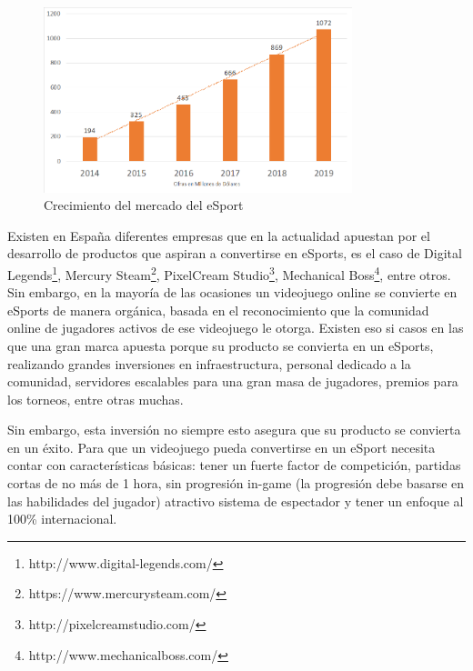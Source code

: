 \begin{figure}[h]
    \centering
    \includegraphics[width=0.8\textwidth]{images/estadodelarte/mercado/crecimiento-esport}
    \caption{Crecimiento del mercado del eSport}
\end{figure}

Existen en España diferentes empresas que en la actualidad apuestan por el desarrollo de productos que aspiran a convertirse en eSports, es el caso de Digital Legends\footnote{http://www.digital-legends.com/}, Mercury Steam\footnote{https://www.mercurysteam.com/}, PixelCream Studio\footnote{http://pixelcreamstudio.com/}, Mechanical Boss\footnote{http://www.mechanicalboss.com/}, entre otros. Sin embargo, en la mayoría de las ocasiones un videojuego online se convierte en eSports de manera orgánica, basada en el reconocimiento que la comunidad online de jugadores activos de ese videojuego le otorga. Existen eso si casos en las que una gran marca apuesta porque su producto se convierta en un eSports, realizando grandes inversiones en infraestructura, personal dedicado a la comunidad, servidores escalables para una gran masa de jugadores, premios para los torneos, entre otras muchas. 

Sin embargo, esta inversión no siempre esto asegura que su producto se convierta en un éxito. Para que un videojuego pueda convertirse en un eSport necesita contar con características básicas: tener un fuerte factor de competición, partidas cortas de no más de 1 hora, sin progresión in-game (la progresión debe basarse en las habilidades del jugador) atractivo sistema de espectador y tener un enfoque al 100\% internacional.

